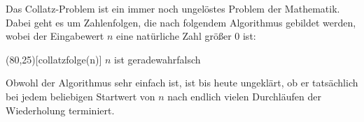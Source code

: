 \documentclass{bschlangaul-aufgabe}
\begin{document}


Das Collatz-Problem ist ein immer noch ungelöstes Problem der
Mathematik. Dabei geht es um Zahlenfolgen, die nach folgendem
Algorithmus gebildet werden, wobei der Eingabewert $n$ eine natürliche
Zahl größer $0$ ist:

\begin{center}
\begin{struktogramm}(80,25)[collatzfolge(n)]
{$n$ ist gerade}{wahr}{falsch}
\change
{}
\ifend
\whileend
\end{struktogramm}
\end{center}

\noindent
Obwohl der Algorithmus sehr einfach ist, ist bis heute ungeklärt, ob er
tatsächlich bei jedem beliebigen Startwert von $n$ nach endlich vielen
Durchläufen der Wiederholung terminiert.
\end{document}
